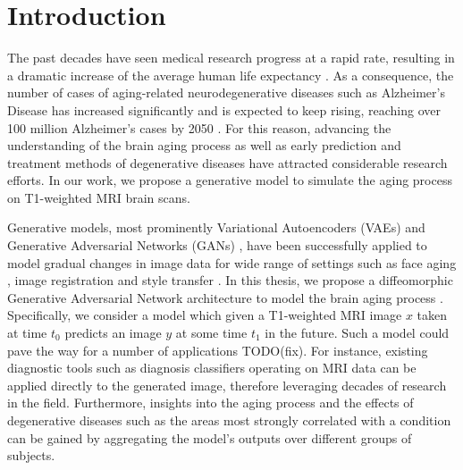 \chapter{Introduction}




The past decades have seen medical research progress at a rapid rate, resulting in a dramatic increase of the average human life expectancy \cite{owidlifeexpectancy}. As a consequence, the number of cases of aging-related neurodegenerative diseases such as Alzheimer's Disease has increased significantly and is expected to keep rising, reaching over 100 million Alzheimer's cases by 2050 \cite{brookmeyer2007forecasting}. For this reason, advancing the understanding of the brain aging process as well as early prediction and treatment methods of degenerative diseases have attracted considerable research efforts. In our work, we propose a generative model to simulate the aging process on T1-weighted MRI brain scans.

Generative models, most prominently Variational Autoencoders (VAEs) \cite{kingma2013auto} and Generative Adversarial Networks (GANs) \cite{goodfellow2014generative}, have been successfully applied to model gradual changes in image data for wide range of settings such as face aging \cite{palsson2018generative}, image registration \cite{balakrishnan2019voxelmorph} and style transfer \cite{zhu2017unpaired}. In this thesis, we propose a diffeomorphic Generative Adversarial Network architecture to model the brain aging process . Specifically, we consider a model which given a T1-weighted MRI image $x$ taken at time $t_0$ predicts an image $y$ at some time $t_1$ in the future. Such a model could pave the way for a number of applications TODO(fix). For instance, existing diagnostic tools such as diagnosis classifiers operating on MRI data can be applied directly to the generated image, therefore leveraging decades of research in the field. Furthermore, insights into the aging process and the effects of degenerative diseases such as the areas most strongly correlated with a condition can be gained by aggregating the model's outputs over different groups of subjects.

